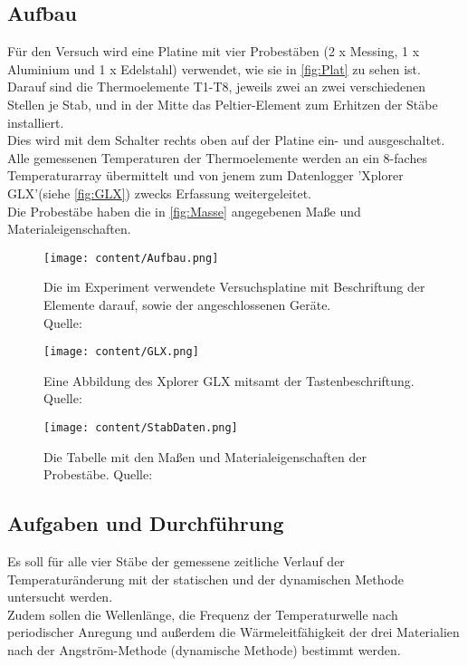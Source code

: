 \subsection{Aufbau}
\label{subsec:Aufbau}
Für den Versuch wird eine Platine mit vier Probestäben (2 x Messing, 1 x Aluminium und 1 x Edelstahl)
verwendet, wie sie in \autoref{fig:Plat} zu sehen ist. \\
Darauf sind die Thermoelemente T1-T8, jeweils zwei
an zwei verschiedenen Stellen je Stab, und in der Mitte das Peltier-Element zum Erhitzen der Stäbe installiert.\\
Dies wird mit dem Schalter rechts oben auf der Platine ein- und ausgeschaltet. \\
Alle gemessenen Temperaturen der Thermoelemente werden an ein 8-faches Temperaturarray
übermittelt und von jenem zum Datenlogger 'Xplorer GLX'(siehe \autoref{fig:GLX}) zwecks Erfassung weitergeleitet. \\
Die Probestäbe haben die in \autoref{fig:Masse} angegebenen Maße und Materialeigenschaften.
\begin{figure}[H]
    \centering
    \texttt{[image: content/Aufbau.png]}
    \caption{Die im Experiment verwendete Versuchsplatine mit Beschriftung der Elemente darauf, sowie der angeschlossenen Geräte. \\Quelle:\cite{sample}}
    \label{fig:Plat}
\end{figure}
\begin{figure}[H]
    \centering
    \texttt{[image: content/GLX.png]}
    \caption{Eine Abbildung des Xplorer GLX mitsamt der Tastenbeschriftung. Quelle:\cite{sample}}
    \label{fig:GLX}
\end{figure}
\begin{figure}[H]
    \centering
    \texttt{[image: content/StabDaten.png]}
    \caption{Die Tabelle mit den Maßen und Materialeigenschaften der Probestäbe. Quelle:\cite{sample}}
    \label{fig:Masse}
\end{figure}
\subsection{Aufgaben und Durchführung}
\label{subsec:AufgDurch}
Es soll für alle vier Stäbe der gemessene zeitliche Verlauf der Temperaturänderung mit der statischen und
der dynamischen Methode untersucht werden. \\
Zudem sollen die Wellenlänge, die Frequenz der Temperaturwelle
nach periodischer Anregung und außerdem die Wärmeleitfähigkeit der drei Materialien nach
der Angström-Methode (dynamische Methode) bestimmt werden.
